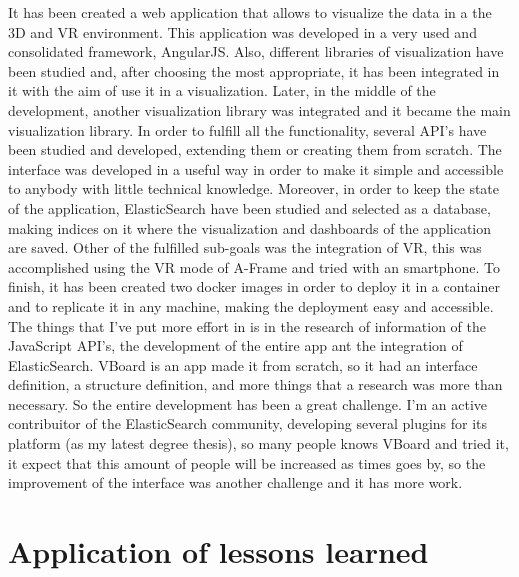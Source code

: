 \documentclass[a4paper, 12pt]{book}
\begin{document}
It has been created a web application that allows to visualize the data in a the 3D and VR environment. This application was developed in a very used and consolidated framework, AngularJS. Also, different libraries of visualization have been studied and, after choosing the most appropriate, it has been integrated in it with the aim of use it in a visualization. Later, in the middle of the development, another visualization library was integrated and it became the main visualization library. In order to fulfill all the functionality, several API's have been studied and developed, extending them or creating them from scratch. The interface was developed in a useful way in order to make it simple and accessible to anybody with little technical knowledge. Moreover, in order to keep the state of the application, ElasticSearch have been studied and selected as a database, making indices on it where the visualization and dashboards of the application are saved. Other of the fulfilled sub-goals was the integration of VR, this was accomplished using the VR mode of A-Frame and tried with an smartphone. To finish, it has been created two docker images in order to deploy it in a container and to replicate it in any machine, making the deployment easy and accessible.\\

The things that I've put more effort in is in the research of information of the JavaScript API's, the development of the entire app ant the integration of ElasticSearch. VBoard is an app made it from scratch, so it had an interface definition, a structure definition, and more things that a research was more than necessary. So the entire development has been a great challenge. I'm an active contribuitor of the ElasticSearch community, developing several plugins for its platform (as my latest degree thesis), so many people knows VBoard and tried it, it expect that this amount of people will be increased as times goes by, so the improvement of the interface was another challenge and it has more work.

\section{Application of lessons learned}
\label{sec:aplication}
\end{document}
